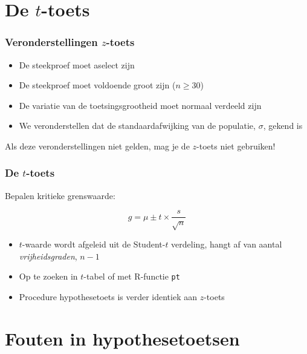 \documentclass[aspectratio=169]{beamer}
\begin{document}
\section{De $t$-toets}

\begin{frame}
  \frametitle{Veronderstellingen $z$-toets}
  
  
  \begin{itemize}
    \item De steekproef moet aselect zijn
    \item De steekproef moet voldoende groot zijn ($n \ge 30$)
    \item De variatie van de toetsingsgrootheid moet normaal verdeeld zijn
    \item We veronderstellen dat de standaardafwijking van de populatie, $\sigma$, gekend is
  \end{itemize}
  
  Als deze veronderstellingen niet gelden, mag je de $z$-toets niet gebruiken!
\end{frame}

\begin{frame}
  \frametitle{De $t$-toets}
  
  Bepalen kritieke grenswaarde:
  
  \[ g = \mu \pm t \times \frac{s}{\sqrt{n}} \]
  
  \begin{itemize}
    \item $t$-waarde wordt afgeleid uit de Student-$t$ verdeling, hangt af van aantal \textit{vrijheidsgraden}, $n-1$
    \item Op te zoeken in $t$-tabel of met R-functie \texttt{pt}
    \item Procedure hypothesetoets is verder identiek aan $z$-toets
  \end{itemize}
  
\end{frame}

\section{Fouten in hypothesetoetsen}
\end{document}

